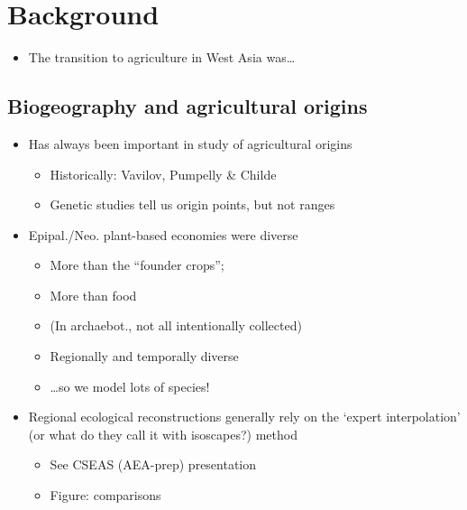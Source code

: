 \documentclass[
  number,
  review]{elsarticle}
\providecommand{\tightlist}{%
  \setlength{\itemsep}{0pt}\setlength{\parskip}{0pt}}\usepackage{longtable,booktabs,array}
\begin{document}
\section{Background}\label{background}

\begin{itemize}
\tightlist
\item
  The transition to agriculture in West Asia was\ldots{}
\end{itemize}

\subsection{Biogeography and agricultural
origins}\label{biogeography-and-agricultural-origins}

\begin{itemize}
\tightlist
\item
  Has always been important in study of agricultural origins

  \begin{itemize}
  \tightlist
  \item
    Historically: Vavilov, Pumpelly \& Childe
  \item
    Genetic studies tell us origin points, but not ranges
  \end{itemize}
\item
  Epipal./Neo. plant-based economies were diverse

  \begin{itemize}
  \tightlist
  \item
    More than the ``founder crops'';
  \item
    More than food
  \item
    (In archaebot., not all intentionally collected)
  \item
    Regionally and temporally diverse
  \item
    \ldots so we model lots of species!
  \end{itemize}
\item
  Regional ecological reconstructions generally rely on the `expert
  interpolation' (or what do they call it with isoscapes?) method

  \begin{itemize}
  \tightlist
  \item
    See CSEAS (AEA-prep) presentation
  \item
    Figure: comparisons
  \end{itemize}
\end{itemize}
\end{document}

